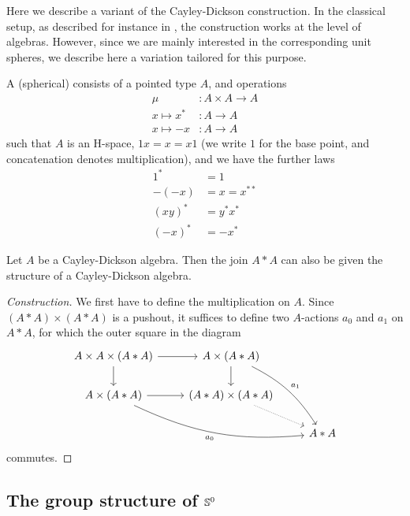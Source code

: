\documentclass{article}
\newcommand{\join}[2]{{#1}*{#2}}
\begin{document}
Here we describe a variant of the Cayley-Dickson construction. In the
classical setup, as described for instance in \cite{Baez2002}, the
construction works at the level of algebras. However, since we are
mainly interested in the corresponding unit spheres, we describe here
a variation tailored for this purpose.

\begin{defn}
  A (spherical)  consists of a pointed
  type $A$, and operations
\begin{align*}
\mu & : A\times A\to A \\
x\mapsto x^\ast & : A\to A \\
x\mapsto -x & : A\to A
\end{align*}
such that $A$ is an H-space, $1x=x=x1$ (we write $1$ for the base
point, and concatenation denotes multiplication), and we have the
further laws
\begin{align*}
  1^* &= 1 \\
  -(-x)&= x = x^{**} \\
  (xy)^* &= y^*x^* \\
  (-x)^* &= -x^*
\end{align*}
\end{defn}

\begin{defn}
Let $A$ be a Cayley-Dickson algebra. Then the join $\join{A}{A}$ can also be
given the structure of a Cayley-Dickson algebra.
\end{defn}

\begin{proof}[Construction]
We first have to define the multiplication on $A$. Since $(\join{A}{A})\times
(\join{A}{A})$ is a pushout, it suffices to define two $A$-actions $a_0$ and
$a_1$ on $\join{A}{A}$, for which the outer square in the diagram
\begin{equation*}
\begin{tikzcd}
A\times A\times(\join{A}{A}) \arrow[r] \arrow[d] & A\times(\join{A}{A}) \arrow[d] \arrow[ddr,bend left=15,"a_1"] \\
A\times(\join{A}{A}) \arrow[r] \arrow[drr,bend right=15,swap,"a_0"] & (\join{A}{A})\times(\join{A}{A}) \arrow[dr,densely dotted] \\
& & \join{A}{A}
\end{tikzcd}
\end{equation*}
commutes. 
\end{proof}

\subsection{The group structure of $\mathbb{S}^0$}
\end{document}
